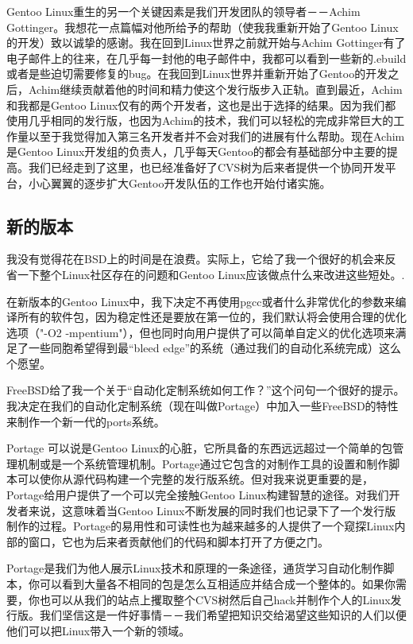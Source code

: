 Gentoo Linux重生的另一个关键因素是我们开发团队的领导者－－Achim Gottinger。我想花一点篇幅对他所给予的帮助（使我我重新开始了Gentoo Linux的开发）致以诚挚的感谢。我在回到Linux世界之前就开始与Achim Gottinger有了电子邮件上的往来，在几乎每一封他的电子邮件中，我都可以看到一些新的.ebuild或者是些迫切需要修复的bug。在我回到Linux世界并重新开始了Gentoo的开发之后，Achim继续贡献着他的时间和精力使这个发行版步入正轨。直到最近，Achim和我都是Gentoo Linux仅有的两个开发者，这也是出于选择的结果。因为我们都使用几乎相同的发行版，也因为Achim的技术，我们可以轻松的完成非常巨大的工作量以至于我觉得加入第三名开发者并不会对我们的进展有什么帮助。现在Achim是Gentoo Linux开发组的负责人，几乎每天Gentoo的都会有基础部分中主要的提高。我们已经走到了这里，也已经准备好了CVS树为后来者提供一个协同开发平台，小心翼翼的逐步扩大Gentoo开发队伍的工作也开始付诸实施。

\subsection{新的版本}

我没有觉得花在BSD上的时间是在浪费。实际上，它给了我一个很好的机会来反省一下整个Linux社区存在的问题和Gentoo Linux应该做点什么来改进这些短处。. 

在新版本的Gentoo Linux中，我下决定不再使用pgcc或者什么非常优化的参数来编译所有的软件包，因为稳定性还是要放在第一位的，我们默认将会使用合理的优化选项（"-O2 -mpentium"），但也同时向用户提供了可以简单自定义的优化选项来满足了一些同胞希望得到最“bleed edge”的系统（通过我们的自动化系统完成）这么个愿望。

FreeBSD给了我一个关于“自动化定制系统如何工作？”这个问句一个很好的提示。我决定在我们的自动化定制系统（现在叫做Portage）中加入一些FreeBSD的特性来制作一个新一代的ports系统。 

Portage 可以说是Gentoo Linux的心脏，它所具备的东西远远超过一个简单的包管理机制或是一个系统管理机制。Portage通过它包含的对制作工具的设置和制作脚本可以使你从源代码构建一个完整的发行版系统。但对我来说更重要的是，Portage给用户提供了一个可以完全接触Gentoo Linux构建智慧的途径。对我们开发者来说，这意味着当Gentoo Linux不断发展的同时我们也记录下了一个发行版制作的过程。Portage的易用性和可读性也为越来越多的人提供了一个窥探Linux内部的窗口，它也为后来者贡献他们的代码和脚本打开了方便之门。

Portage是我们为他人展示Linux技术和原理的一条途径，通货学习自动化制作脚本，你可以看到大量各不相同的包是怎么互相适应并结合成一个整体的。如果你需要，你也可以从我们的站点上攫取整个CVS树然后自己hack并制作个人的Linux发行版。我们坚信这是一件好事情－－我们希望把知识交给渴望这些知识的人们以便他们可以把Linux带入一个新的领域。


